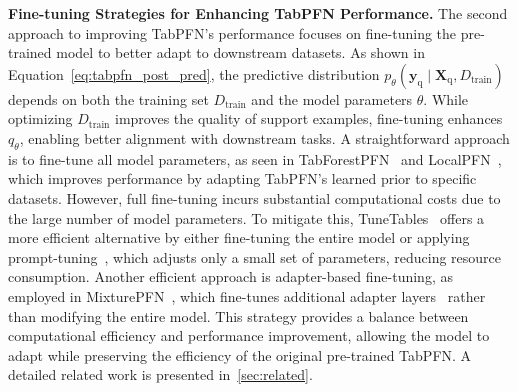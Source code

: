 \textbf{Fine-tuning Strategies for Enhancing TabPFN Performance.}
The second approach to improving TabPFN’s performance focuses on fine-tuning the pre-trained model to better adapt to downstream datasets. As shown in Equation~\ref{eq:tabpfn_post_pred}, the predictive distribution 
\( p_\theta(\boldsymbol{y}_{\text{q}} \mid \boldsymbol{X}_{\text{q}}, D_{\text{train}}) \) 
depends on both the training set \( D_{\text{train}} \) and the model parameters \( \theta \). While optimizing \( D_{\text{train}} \) improves the quality of support examples, fine-tuning enhances \( q_\theta \), enabling better alignment with downstream tasks.
A straightforward approach is to fine-tune all model parameters, as seen in TabForestPFN~\cite{TabForestPFN} and LocalPFN~\cite{LocalPFN}, which improves performance by adapting TabPFN’s learned prior to specific datasets. However, full fine-tuning incurs substantial computational costs due to the large number of model parameters. To mitigate this, TuneTables~\cite{TuneTables} offers a more efficient alternative by either fine-tuning the entire model or applying prompt-tuning~\cite{DBLP:conf/emnlp/LesterAC21}, which adjusts only a small set of parameters, reducing resource consumption.
Another efficient approach is adapter-based fine-tuning, as employed in MixturePFN~\cite{MixturePFN}, which fine-tunes additional adapter layers~\cite{Serial_Adapter} rather than modifying the entire model. This strategy provides a balance between computational efficiency and performance improvement, allowing the model to adapt while preserving the efficiency of the original pre-trained TabPFN.  A
detailed related work is presented in~\autoref{sec:related}.


